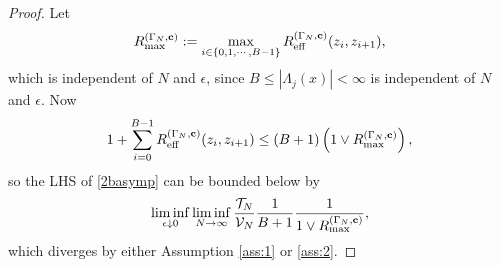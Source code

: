 \documentclass[11pt]{amsart}
\theoremstyle{plain}
\theoremstyle{definition}
\theoremstyle{remark}
\begin{document}
\begin{proof}
Let
\begin{align*}
R^{(\Gamma_N,{\bf c})}_{\max} := \max_{i\in \{0,1,\cdots, B-1\}} R_{\rm eff}^{(\Gamma_N, {\bf c})}(z_i, z_{i+1}),
\end{align*}
which is independent of $N$ and $\epsilon$, since $B\leq |\Lambda_j(x)|<\infty$ is independent of $N$ and $\epsilon$.
Now
\[
1+ \sum_{i=0}^{B-1} R_{\rm eff}^{(\Gamma_N,{\bf c})}(z_i, z_{i+1}) \leq (B+1) \left(1\vee R^{(\Gamma_N,{\bf c})}_{\max}\right),
\]
so the LHS of \eqref{2basymp} can be bounded below by
\[
\liminf_{\epsilon\downarrow 0} \liminf_{N\to\infty} \frac{\mathcal{T}_N}{\mathcal{V}_N} \frac{1}{B+1} \frac{1}{1\vee R_{\max}^{(\Gamma_N,{\bf c})}},
\]
which diverges by either Assumption \ref{ass:1} or \ref{ass:2}. 




\end{proof}
\end{document}

